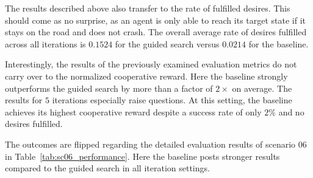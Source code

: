 The results described above also transfer to the rate of fulfilled desires. This should come as no surprise, as an agent is only able to reach its target state if it stays on the road and does not crash. The overall average rate of desires fulfilled across all iterations is $0.1524$ for the guided search versus $0.0214$ for the baseline.

Interestingly, the results of the previously examined evaluation metrics do not carry over to the normalized cooperative reward. Here the baseline strongly outperforms the guided search by more than a factor of $2 \times$ on average. The results for $5$ iterations especially raise questions. At this setting, the baseline achieves its highest cooperative reward despite a success rate of only $2 \%$ and no desires fulfilled.

The outcomes are flipped regarding the detailed evaluation results of scenario 06 in Table~\ref{tab:sc06_performance}. Here the baseline posts stronger results compared to the guided search in all iteration settings.
